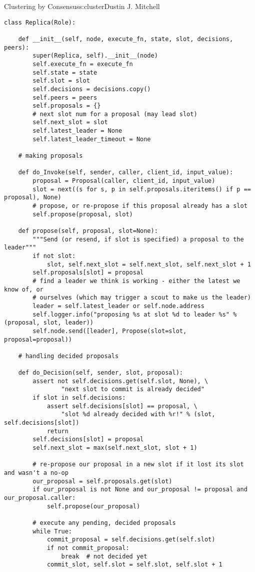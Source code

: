 \begin{aosachapter}{Clustering by Consensus}{s:cluster}{Dustin J. Mitchell}
\begin{verbatim}
class Replica(Role):

    def __init__(self, node, execute_fn, state, slot, decisions, peers):
        super(Replica, self).__init__(node)
        self.execute_fn = execute_fn
        self.state = state
        self.slot = slot
        self.decisions = decisions.copy()
        self.peers = peers
        self.proposals = {}
        # next slot num for a proposal (may lead slot)
        self.next_slot = slot
        self.latest_leader = None
        self.latest_leader_timeout = None

    # making proposals

    def do_Invoke(self, sender, caller, client_id, input_value):
        proposal = Proposal(caller, client_id, input_value)
        slot = next((s for s, p in self.proposals.iteritems() if p == proposal), None)
        # propose, or re-propose if this proposal already has a slot
        self.propose(proposal, slot)

    def propose(self, proposal, slot=None):
        """Send (or resend, if slot is specified) a proposal to the leader"""
        if not slot:
            slot, self.next_slot = self.next_slot, self.next_slot + 1
        self.proposals[slot] = proposal
        # find a leader we think is working - either the latest we know of, or
        # ourselves (which may trigger a scout to make us the leader)
        leader = self.latest_leader or self.node.address
        self.logger.info("proposing %s at slot %d to leader %s" % (proposal, slot, leader))
        self.node.send([leader], Propose(slot=slot, proposal=proposal))

    # handling decided proposals

    def do_Decision(self, sender, slot, proposal):
        assert not self.decisions.get(self.slot, None), \
                "next slot to commit is already decided"
        if slot in self.decisions:
            assert self.decisions[slot] == proposal, \
                "slot %d already decided with %r!" % (slot, self.decisions[slot])
            return
        self.decisions[slot] = proposal
        self.next_slot = max(self.next_slot, slot + 1)

        # re-propose our proposal in a new slot if it lost its slot and wasn't a no-op
        our_proposal = self.proposals.get(slot)
        if our_proposal is not None and our_proposal != proposal and our_proposal.caller:
            self.propose(our_proposal)

        # execute any pending, decided proposals
        while True:
            commit_proposal = self.decisions.get(self.slot)
            if not commit_proposal:
                break  # not decided yet
            commit_slot, self.slot = self.slot, self.slot + 1


\end{verbatim}
\end{aosachapter}
